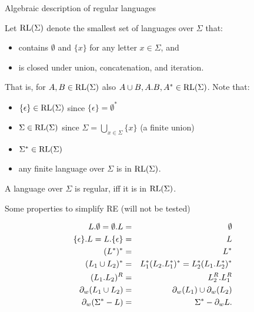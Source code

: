 \documentclass[handout]{beamer}
\begin{document}
\begin{frame}{Algebraic description of regular languages}

    Let \alert{$\operatorname{RL}(\Sigma)$} denote the smallest set of languages over $\Sigma$ that:
    \begin{itemize}
        \item contains $\emptyset$ and $\{x\}$ for any letter $x\in \Sigma$, and 
        \item is closed under union, concatenation, and iteration.
    \end{itemize}
    That is, for $A,B\in \operatorname{RL}(\Sigma)$ also $A\cup B,A.B,A^*\in \operatorname{RL}(\Sigma)$. Note that:

    \begin{itemize}
        \item $\{\epsilon\}\in\operatorname{RL}(\Sigma)$ since $\{\epsilon\}=\emptyset^*$
        \item $\Sigma\in\operatorname{RL}(\Sigma)$ since $\Sigma=\bigcup_{x\in \Sigma}\{x\}$ (a finite union)
        \item $\Sigma^*\in\operatorname{RL}(\Sigma)$
        \item any finite language over $\Sigma$ is in $\operatorname{RL}(\Sigma)$.
    \end{itemize}
        
    \bigskip
        
    \begin{theorem}
        A language over $\Sigma$ is regular, iff it is in $\operatorname{RL}(\Sigma)$.
    \end{theorem}    

\end{frame}


\begin{frame}{Some properties to simplify RE  (will not be tested)}

    \begin{eqnarray*}
        L.\emptyset=\emptyset.L&=&\emptyset\\
        \{\epsilon\}.L=L.\{\epsilon\}&=& L\\
        (L^*)^* &=& L^*\\
        (L_1\cup L_2)^*&=& L_1^*(L_2.L_1^*)^*=L_2^*(L_1.L_2^*)^*\\
        (L_1.L_2)^R&=&L_2^R.L_1^R\\
        \partial_w(L_1\cup L_2)&=&\partial_w(L_1)\cup \partial_w(L_2)\\
        \partial_w(\Sigma^*-L)&=&\Sigma^*-\partial_w L\hbox{.}
    \end{eqnarray*}

\end{frame}
\end{document}
